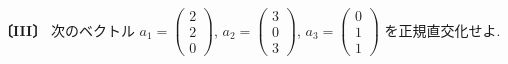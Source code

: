 \noindent\textbf{〔III〕}
次のベクトル
$a_1=\begin{pmatrix}2\\2\\0\end{pmatrix}$,
$a_2=\begin{pmatrix}3\\0\\3\end{pmatrix}$,
$a_3=\begin{pmatrix}0\\1\\1\end{pmatrix}$
を正規直交化せよ.
